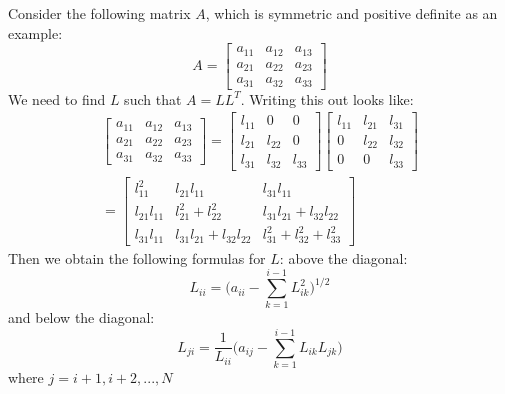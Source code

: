 \documentclass[../Dissertation.tex]{subfiles}
\begin{document}
Consider the following matrix $A$, which is symmetric and positive definite as an example:
					\begin{equation}
						\label{eqn:matricescholesky}
					A = 
					\begin{bmatrix}
						a_{11} & a_{12} & a_{13}\\
						a_{21} & a_{22} & a_{23}\\
						a_{31} & a_{32} & a_{33}
					\end{bmatrix}
					\end{equation}
We need to find $L$ such that $A=LL^T$. 
Writing this out looks like:
					\begin{multline}
					\begin{bmatrix}
						a_{11} & a_{12} & a_{13}\\
						a_{21} & a_{22} & a_{23}\\
						a_{31} & a_{32} & a_{33}
					\end{bmatrix}
					=
					\begin{bmatrix}
						l_{11} & 0 & 0\\
						l_{21} & l_{22} & 0\\
						l_{31} & l_{32} & l_{33}
					\end{bmatrix}
					\begin{bmatrix}
						l_{11} & l_{21} & l_{31}\\
						0 & l_{22} & l_{32}\\
						0 & 0 & l_{33}
					\end{bmatrix}
					\\=
					\begin{bmatrix}
						l_{11}^2 & l_{21}l_{11} & l_{31}l_{11}\\
						l_{21}l_{11} & l_{21}^2 + l_{22}^2 & l_{31}l_{21}+l_{32}l_{22}\\
						l_{31}l_{11} &  l_{31}l_{21}+l_{32}l_{22} & l_{31}^2+l_{32}^2+l_{33}^2
					\end{bmatrix}
					\end{multline}
Then we obtain the following formulas for $L$:
above the diagonal:
					\begin{equation}
						\label{eqn:diagonalL}
						L_{ii} = \Bigg( a_{ii}-\sum_{k=1}^{i-1}L_{ik}^2\Bigg)^{1/2}
					\end{equation}
and below the diagonal:					
					\begin{equation}
						\label{eqn:belowdiagonalL}
						L_{ji}=\frac{1}{L_{ii}}\Bigg(a_{ij}-\sum_{k=1}^{i-1}L_{ik}L_{jk}\Bigg)
					\end{equation}				
where $j = i+ 1, i+2,...,N$
\end{document}
